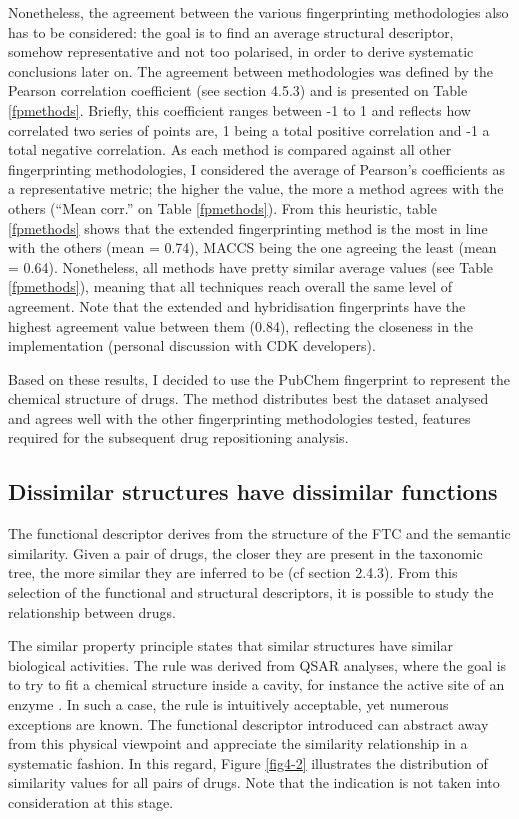 Nonetheless, the agreement between the various fingerprinting methodologies also has to be considered: the goal is to find an average structural descriptor, somehow representative and not too polarised, in order to derive systematic conclusions later on. The agreement between methodologies was defined by the Pearson correlation coefficient (see section 4.5.3) and is presented on Table \ref{fpmethods}. Briefly, this coefficient ranges between -1 to 1 and reflects how correlated two series of points are, 1 being a total positive correlation and -1 a total negative correlation. As each method is compared against all other fingerprinting methodologies, I considered the average of Pearson's coefficients as a representative metric; the higher the value, the more a method agrees with the others (``Mean corr.'' on Table \ref{fpmethods}). From this heuristic, table \ref{fpmethods} shows that the extended fingerprinting method is the most in line with the others (mean = 0.74), MACCS being the one agreeing the least (mean = 0.64). Nonetheless, all methods have pretty similar average values (see Table \ref{fpmethods}), meaning that all techniques reach overall the same level of agreement. Note that the extended and hybridisation fingerprints have the highest agreement value between them (0.84), reflecting the closeness in the implementation (personal discussion with CDK developers).

Based on these results, I decided to use the PubChem fingerprint to represent the chemical structure of drugs. The method distributes best the dataset analysed and agrees well with the other fingerprinting methodologies tested, features required for the subsequent drug repositioning analysis.

\subsection{Dissimilar structures have dissimilar functions}
The functional descriptor derives from the structure of the FTC and the semantic similarity. Given a pair of drugs, the closer they are present in the taxonomic tree, the more similar they are inferred to be (cf section 2.4.3). From this selection of the functional and structural descriptors, it is possible to study the relationship between drugs.

The similar property principle states that similar structures have similar biological activities. The rule was derived from QSAR analyses, where the goal is to try to fit a chemical structure inside a cavity, for instance the active site of an enzyme \citep{todeschini2009molecular}. In such a case, the rule is intuitively acceptable, yet numerous exceptions are known. The functional descriptor introduced can abstract away from this physical viewpoint and appreciate the similarity relationship in a systematic fashion. In this regard, Figure \ref{fig4-2} illustrates the distribution of similarity values for all pairs of drugs. Note that the indication is not taken into consideration at this stage.

